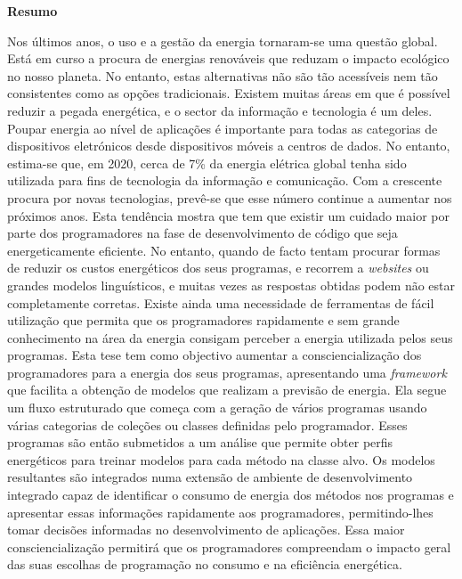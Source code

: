 \vspace*{2cm}
\begin{center}
\Large \bf Resumo
\end{center}
\vspace*{1cm} \setlength{\baselineskip}{0.6cm}

Nos últimos anos, o uso e a gestão da energia tornaram-se uma questão global. Está em curso a procura de energias renováveis que reduzam o impacto ecológico no nosso planeta. No entanto, estas alternativas não são tão acessíveis nem tão consistentes como as opções tradicionais. Existem muitas áreas em que é possível reduzir a pegada energética, e o sector da informação e tecnologia é um deles.
Poupar energia ao nível de aplicações é importante para todas as categorias de dispositivos eletrónicos desde dispositivos móveis a centros de dados. No entanto, estima-se que, em 2020, cerca de 7\% da energia elétrica global tenha sido utilizada para fins de tecnologia da informação e comunicação. Com a crescente procura por novas tecnologias, prevê-se que esse número continue a aumentar nos próximos anos. 
Esta tendência mostra que tem que existir um cuidado maior por parte dos programadores na fase de desenvolvimento de código que seja energeticamente eficiente. No entanto, quando de facto tentam procurar formas de reduzir os custos energéticos dos seus programas, e recorrem a \textit{websites} ou grandes modelos linguísticos, e muitas vezes as respostas obtidas podem não estar completamente corretas. Existe ainda uma necessidade de ferramentas de fácil utilização que permita que os programadores rapidamente e sem grande conhecimento na área da energia consigam perceber a energia utilizada pelos seus programas.
Esta tese tem como objectivo aumentar a consciencialização dos programadores para a energia dos seus programas, apresentando uma \textit{framework} que facilita a obtenção de modelos que realizam a previsão de energia. Ela segue um fluxo estruturado que começa com a geração de vários programas usando várias categorias de coleções ou classes definidas pelo programador. Esses programas são então submetidos a um análise que permite obter perfis energéticos para treinar modelos para cada método na classe alvo.
Os modelos resultantes são integrados numa extensão de ambiente de desenvolvimento integrado capaz de identificar o consumo de energia dos métodos nos programas e apresentar essas informações rapidamente aos programadores, permitindo-lhes tomar decisões informadas no desenvolvimento de aplicações.
Essa maior consciencialização permitirá que os programadores compreendam o impacto geral das suas escolhas de programação no consumo e na eficiência energética.
